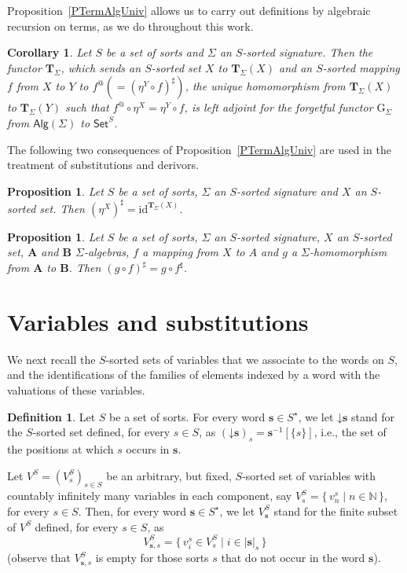 \documentclass[a4paper, reqno]{amsbook}
\newcommand{\bb}[1]{\ensuremath{\lvert #1 \rvert}}
\newcommand{\vs}[1]{\mathbin{\downarrow}#1}
\newcommand{\id}{\mathrm{id}}
\theoremstyle{plain}
\newtheorem{proposition}[theorem]{Proposition}
\newtheorem{corollary}[theorem]{Corollary}
\theoremstyle{definition}
\newtheorem{definition}[theorem]{Definition}
\begin{document}
Proposition~\ref{PTermAlgUniv} allows us to carry out definitions by algebraic recursion on terms, as we do throughout this work.

\begin{corollary}\label{CTermAlgAdj}
Let $S$ be a set of sorts and $\Sigma$ an $S$-sorted signature.
Then the functor $\mathbf{T}_{\Sigma}$, which sends an $S$-sorted set $X$ to $\mathbf{T}_{\Sigma}(X)$ and an $S$-sorted mapping $f$ from $X$ to $Y$ to $f^{@} (= (\eta^{Y}\circ f)^{\sharp})$, the unique homomorphism from $\mathbf{T}_{\Sigma}(X)$ to $\mathbf{T}_{\Sigma}(Y)$ such that $f^{@}\circ\eta^{X} = \eta^{Y}\circ f$, is left adjoint for the forgetful functor $\mathrm{G}_{\Sigma}$ from $\mathsf{Alg}(\Sigma)$ to $\mathsf{Set}^{S}$.
\end{corollary}

The following two consequences of Proposition~\ref{PTermAlgUniv} are used in the treatment of substitutions and derivors.

\begin{proposition}\label{PTermAlgUnivId}
Let $S$ be a set of sorts, $\Sigma$ an $S$-sorted signature and $X$ an $S$-sorted set.
Then $(\eta^{X})^{\sharp} = \id^{\mathbf{T}_{\Sigma}(X)}$.
\end{proposition}

\begin{proposition}\label{PTermAlgUnivComp}
Let $S$ be a set of sorts, $\Sigma$ an $S$-sorted signature, $X$ an $S$-sorted set, $\mathbf{A}$ and $\mathbf{B}$ $\Sigma$-algebras, $f$ a mapping from $X$ to $A$ and $g$ a $\Sigma$-homomorphism from $\mathbf{A}$ to $\mathbf{B}$.
Then $(g \circ f)^{\sharp} = g \circ f^{\sharp}$.
\end{proposition}

\section{Variables and substitutions}\label{SVariables}

We next recall the $S$-sorted sets of variables that we associate to the words on $S$, and the identifications of the families of elements indexed by a word with the valuations of these variables.

\begin{definition}\label{DVariables}
Let $S$ be a set of sorts.
For every word $\mathbf{s}\in S^{\star}$, we let $\vs{\mathbf{s}}$ stand for the $S$-sorted set defined, for every $s\in S$, as $(\vs{\mathbf{s}})_{s} = \mathbf{s}^{-1}[\{s\}]$, i.e., the set of the positions at which $s$ occurs in $\mathbf{s}$.

Let $V^{S} = (V^{S}_{s})_{s\in S}$ be an arbitrary, but fixed, $S$-sorted set of variables with countably infinitely many variables in each component, say $V^{S}_{s} = \{\,v^{s}_{n}\mid n\in \mathbb{N}\,\}$, for every $s\in S$.
Then, for every word $\mathbf{s}\in S^{\star}$, we let $V^{S}_{\mathbf{s}}$ stand for the finite subset of $V^{S}$ defined, for every $s\in S$, as
$$
V^{S}_{\mathbf{s},s} = \{\,v^{s}_{i}\in V^{S}_{s}\mid i\in \bb{\mathbf{s}}_{s}\,\}
$$
(observe that $V^{S}_{\mathbf{s},s}$ is empty for those sorts $s$ that do not occur in the word $\mathbf{s}$).
\end{definition}
\end{document}
